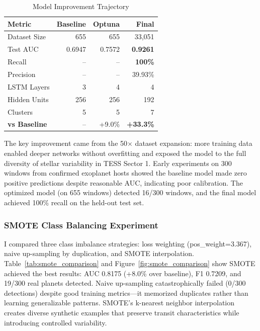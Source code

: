 \documentclass[letterpaper]{article} %
\begin{document}
\begin{table}[h]
    \centering
    \caption{Model Improvement Trajectory}
    \label{tab:optimization_results}
    \begin{tabular}{@{}lrrr@{}}
        \toprule
        \textbf{Metric} & \textbf{Baseline} & \textbf{Optuna} & \textbf{Final} \\
        \midrule
        Dataset Size & 655 & 655 & 33,051 \\
        Test AUC & 0.6947 & 0.7572 & \textbf{0.9261} \\
        Recall & -- & -- & \textbf{100\%} \\
        Precision & -- & -- & 39.93\% \\
        LSTM Layers & 3 & 4 & 4 \\
        Hidden Units & 256 & 256 & 192 \\
        Clusters & 5 & 5 & 7 \\
        \midrule
        \textbf{vs Baseline} & -- & +9.0\% & \textbf{+33.3\%} \\
        \bottomrule
    \end{tabular}
\end{table}

The key improvement came from the 50$\times$ dataset expansion: more training data enabled deeper networks without overfitting and exposed the model to the full diversity of stellar variability in TESS Sector 1. Early experiments on 300 windows from confirmed exoplanet hosts showed the baseline model made zero positive predictions despite reasonable AUC, indicating poor calibration. The optimized model (on 655 windows) detected 16/300 windows, and the final model achieved 100\% recall on the held-out test set.

\subsubsection{SMOTE Class Balancing Experiment}

I compared three class imbalance strategies: loss weighting (pos\_weight=3.367), naive up-sampling by duplication, and SMOTE interpolation. Table~\ref{tab:smote_comparison} and Figure~\ref{fig:smote_comparison} show SMOTE achieved the best results: AUC 0.8175 (+8.0\% over baseline), F1 0.7209, and 19/300 real planets detected. Naive up-sampling catastrophically failed (0/300 detections) despite good training metrics---it memorized duplicates rather than learning generalizable patterns. SMOTE's k-nearest neighbor interpolation creates diverse synthetic examples that preserve transit characteristics while introducing controlled variability.
\end{document}
